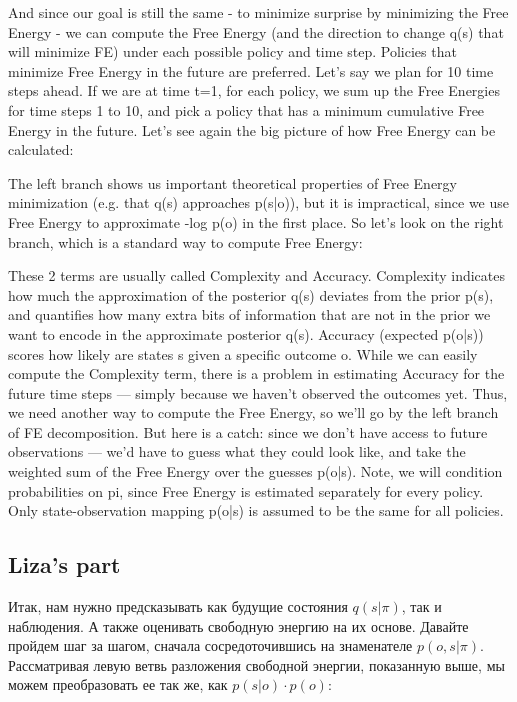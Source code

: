 \documentclass[12pt]{article}
\begin{document}
And since our goal is still the same - to minimize surprise by minimizing the Free Energy - we can compute the Free Energy (and the direction to change q(s) that will minimize FE) under each possible policy and time step.
Policies that minimize Free Energy in the future are preferred. Let's say we plan for 10 time steps ahead. If we are at time t=1, for each policy, we sum up the Free Energies for time steps 1 to 10, and pick a policy that has a minimum cumulative Free Energy in the future. Let's see again the big picture of how Free Energy can be calculated:

The left branch shows us important theoretical properties of Free Energy minimization (e.g. that q(s) approaches p(s|o)), but it is impractical, since we use Free Energy to approximate -log p(o) in the first place. So let's look on the right branch, which is a standard way to compute Free Energy:

These 2 terms are usually called Complexity and Accuracy. Complexity indicates how much the approximation of the posterior q(s) deviates from the prior p(s), and quantifies how many extra bits of information that are not in the prior we want to encode in the approximate posterior q(s). Accuracy (expected p(o|s)) scores how likely are states s given a specific outcome o. While we can easily compute the Complexity term, there is a problem in estimating Accuracy for the future time steps — simply because we haven't observed the outcomes yet. Thus, we need another way to compute the Free Energy, so we'll go by the left branch of FE decomposition. But here is a catch: since we don't have access to future observations — we'd have to guess what they could look like, and take the weighted sum of the Free Energy over the guesses p(o|s). Note, we will condition probabilities on pi, since Free Energy is estimated separately for every policy. Only state-observation mapping p(o|s) is assumed to be the same for all policies.
\newpage
\subsection{Liza's part}

Итак, нам нужно предсказывать как будущие состояния $q(s|\pi)$, так и наблюдения. А также оценивать свободную энергию на их основе. Давайте пройдем шаг за шагом, сначала сосредоточившись на знаменателе $p(o,s|\pi)$. Рассматривая левую ветвь разложения свободной энергии, показанную выше, мы можем преобразовать ее так же, как $p(s|o) \cdot p(o)$:

\end{document}

